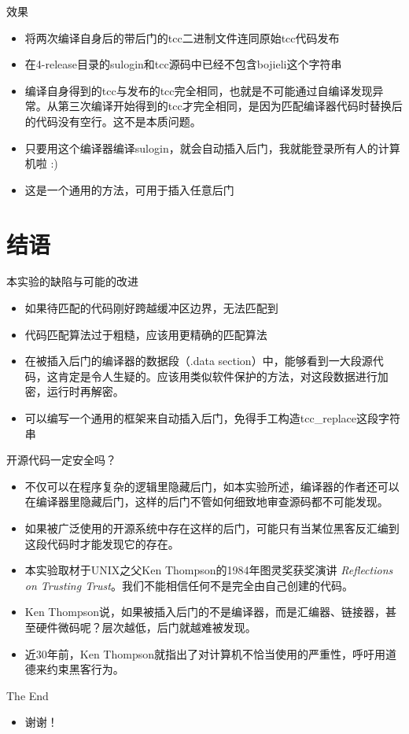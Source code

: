 \documentclass{beamer}
\begin{document}
\begin{frame}{效果}
\begin{itemize}
  \item 将两次编译自身后的带后门的tcc二进制文件连同原始tcc代码发布
  \item 在4-release目录的sulogin和tcc源码中已经不包含bojieli这个字符串
  \item 编译自身得到的tcc与发布的tcc完全相同，也就是不可能通过自编译发现异常。从第三次编译开始得到的tcc才完全相同，是因为匹配编译器代码时替换后的代码没有空行。这不是本质问题。
  \item 只要用这个编译器编译sulogin，就会自动插入后门，我就能登录所有人的计算机啦 :)
  \item 这是一个通用的方法，可用于插入任意后门
\end{itemize}
\end{frame}

\section{结语}

\begin{frame}{本实验的缺陷与可能的改进}
\begin{itemize}
  \item 如果待匹配的代码刚好跨越缓冲区边界，无法匹配到
  \item 代码匹配算法过于粗糙，应该用更精确的匹配算法
  \item 在被插入后门的编译器的数据段（.data section）中，能够看到一大段源代码，这肯定是令人生疑的。应该用类似软件保护的方法，对这段数据进行加密，运行时再解密。
  \item 可以编写一个通用的框架来自动插入后门，免得手工构造tcc\_replace这段字符串
\end{itemize}
\end{frame}

\begin{frame}{开源代码一定安全吗？}
\begin{itemize}
  \item 不仅可以在程序复杂的逻辑里隐藏后门，如本实验所述，编译器的作者还可以在编译器里隐藏后门，这样的后门不管如何细致地审查源码都不可能发现。
  \item 如果被广泛使用的开源系统中存在这样的后门，可能只有当某位黑客反汇编到这段代码时才能发现它的存在。
  \item 本实验取材于UNIX之父Ken Thompson的1984年图灵奖获奖演讲 \emph{Reflections on Trusting Trust}。我们不能相信任何不是完全由自己创建的代码。
  \item Ken Thompson说，如果被插入后门的不是编译器，而是汇编器、链接器，甚至硬件微码呢？层次越低，后门就越难被发现。
  \item 近30年前，Ken Thompson就指出了对计算机不恰当使用的严重性，呼吁用道德来约束黑客行为。
\end{itemize}
\end{frame}

\begin{frame}{The End}
\begin{itemize}
  \item 谢谢！
\end{itemize}
\end{frame}
\end{document}

